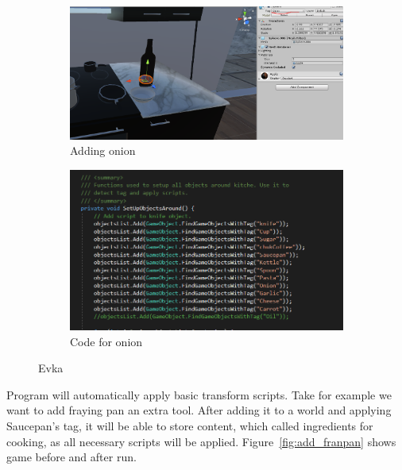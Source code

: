 \documentclass[18pt]{article}
\numberwithin{equation}{section} %
\numberwithin{figure}{section} %
\numberwithin{table}{section} %
\begin{document}
	\begin{figure}[H]
		\centering
		\begin{subfigure}{0.45\textwidth}
			\centering
			\includegraphics[width=1\linewidth]{images/add_onion}
			\caption{Adding onion}
		\end{subfigure}
		\begin{subfigure}{0.45\textwidth}
			\centering
			\includegraphics[width=0.85\linewidth]{images/add_onion_code}
			\caption{Code for onion}
		\end{subfigure}		
		\caption{Evka}
		\label{fig:add_object}
	\end{figure}
	
	Program will automatically apply basic transform scripts. Take for example we want to add fraying pan an extra tool. After adding it to a world and applying Saucepan's tag, it will be able to store content, which called ingredients for cooking, as all necessary scripts will be applied. Figure~\ref{fig:add_franpan} shows game before and after run. \\
	
\end{document}
